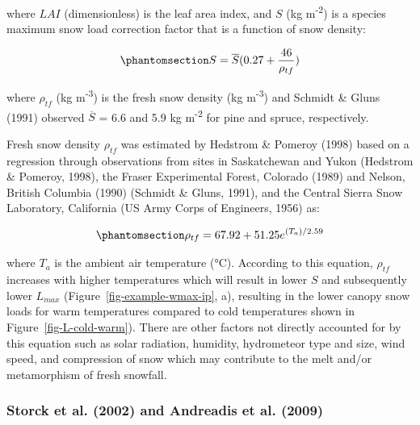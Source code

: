 \documentclass[
  letterpaper,
]{tex/uofsthesis-cs}
\begin{document}
where \(LAI\) (dimensionless) is the leaf area index, and \(S\) (kg
m\textsuperscript{-2}) is a species maximum snow load correction factor
that is a function of snow density:

\begin{equation}\phantomsection\label{eq-species-correction}{
S = \overline{S} (0.27 + \frac{46}{\rho_{tf}})
}\end{equation}

where \(\rho_{tf}\) (kg m\textsuperscript{-3}) is the fresh snow density
(kg m\textsuperscript{-3}) and Schmidt \& Gluns (1991) observed
\(\overline{S}\) = 6.6 and 5.9 kg m\textsuperscript{-2} for pine and
spruce, respectively.

Fresh snow density \(\rho_{tf}\) was estimated by Hedstrom \& Pomeroy
(1998) based on a regression through observations from sites in
Saskatchewan and Yukon (Hedstrom \& Pomeroy, 1998), the Fraser
Experimental Forest, Colorado (1989) and Nelson, British Columbia (1990)
(Schmidt \& Gluns, 1991), and the Central Sierra Snow Laboratory,
California (US Army Corps of Engineers, 1956) as:

\begin{equation}\phantomsection\label{eq-rhoSnow}{
\rho_{tf} = 67.92 + 51.25 e ^{(T_{a})/2.59}
}\end{equation}

where \(T_a\) is the ambient air temperature (°C). According to this
equation, \(\rho_{tf}\) increases with higher temperatures which will
result in lower \(S\) and subsequently lower \(L_{max}\)
(Figure~\ref{fig-example-wmax-ip}, a), resulting in the lower canopy
snow loads for warm temperatures compared to cold temperatures shown in
Figure~\ref{fig-L-cold-warm}). There are other factors not directly
accounted for by this equation such as solar radiation, humidity,
hydrometeor type and size, wind speed, and compression of snow which may
contribute to the melt and/or metamorphism of fresh snowfall.

\subsubsection{Storck et al. (2002) and Andreadis et al.
(2009)}\label{storck2002-and-andreadis2009}
\end{document}
